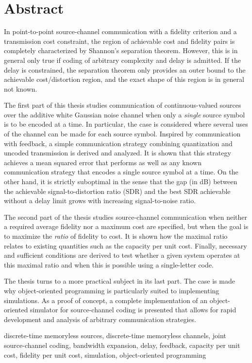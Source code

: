 \chapter*{Abstract}
\nocite{KleinerR2009a}



In point-to-point source-channel communication with a fidelity criterion and a transmission cost constraint, the region of achievable cost and fidelity pairs is completely characterized by Shannon's separation theorem. However, this is in general only true if coding of arbitrary complexity and delay is admitted. If the delay is constrained, the separation theorem only provides an outer bound to the achievable cost\slash distortion region, and the exact shape of this region is in general not known.

The first part of this thesis studies communication of continuous-valued sources
over the additive white Gaussian noise channel when only a \emph{single} source
symbol is to be encoded at a time. In particular, the case is considered where
several uses of the channel can be made for each source symbol. Inspired by
communication with feedback, a simple communication strategy combining
quantization and uncoded transmission is derived and analyzed. It is shown that
this strategy achieves a mean squared error that performs as well as any known
communication strategy that encodes a single source symbol at a time. On the
other hand, it is strictly suboptimal in the sense that the gap (in dB) between
the achievable signal-to-distortion ratio (SDR) and the best SDR achievable
without a delay limit grows with increasing signal-to-noise ratio. 

The second part of the thesis studies source-channel communication when neither
a required average fidelity nor a maximum cost are specified, but when the goal
is to maximize the \emph{ratio} of fidelity to cost. It is shown how the
maximal ratio relates to existing quantities such as the capacity per unit cost.
Finally, necessary and sufficient conditions are derived to test whether a given
system operates at this maximal ratio and when this is possible using a
single-letter code. 

The thesis turns to a more practical subject in its last part. The case is made
why object-oriented programming is particularly suited to implementing
simulations. As a proof of concept, a complete implementation of an
object-oriented simulator for source-channel coding is presented that allows for
rapid development and analysis of arbitrary communication strategies.

\begin{keywords}
  discrete-time memoryless sources, discrete-time memoryless channels, joint
  source-channel coding, bandwidth expansion, delay, feedback, capacity per
  unit cost, fidelity per unit cost, simulation, object-oriented programming
\end{keywords}

